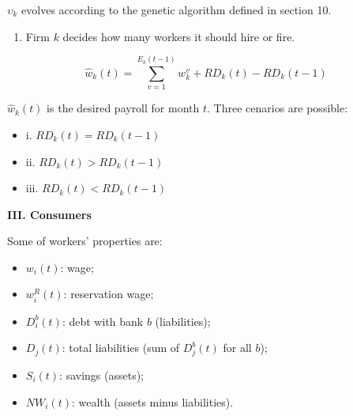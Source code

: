 \documentclass[11pt,]{article}
\providecommand{\tightlist}{%
\setlength{\itemsep}{0pt}\setlength{\parskip}{0pt}}
\begin{document}
\(\upsilon_k\) evolves according to the genetic algorithm defined in
section 10.

\begin{enumerate}
\def\labelenumi{\alph{enumi}.}
\setcounter{enumi}{1}
\tightlist
\item
  Firm \(k\) decides how many workers it should hire or fire.
\end{enumerate}

\begin{equation}
\hat{w}_k(t) = \sum_{v=1}^{E_k(t-1)} w^v_k + RD_k(t) - RD_k(t-1)
\end{equation}

\(\hat{w}_k(t)\) is the desired payroll for month \(t\). Three cenarios
are possible:

\begin{itemize}
  \item[] i.  $RD_k(t) = RD_k(t-1)$
  
  
  \item[] ii.  $RD_k(t) > RD_k(t-1)$
  
  
  \item[] iii. $RD_k(t) < RD_k(t-1)$
  
  
\end{itemize}

\textbf{III. Consumers}

Some of workers' properties are:

\begin{itemize}
\tightlist
\item
  \(w_i(t)\): wage;
\item
  \(w_i^R(t)\): reservation wage;
\item
  \(D_i^b(t)\): debt with bank \(b\) (liabilities);
\item
  \(D_j(t)\): total liabilities (sum of \(D_j^b(t)\) for all \(b\));
\item
  \(S_i(t)\): savings (assets);
\item
  \(NW_i(t)\): wealth (assets minus liabilities).
\end{itemize}
\end{document}
